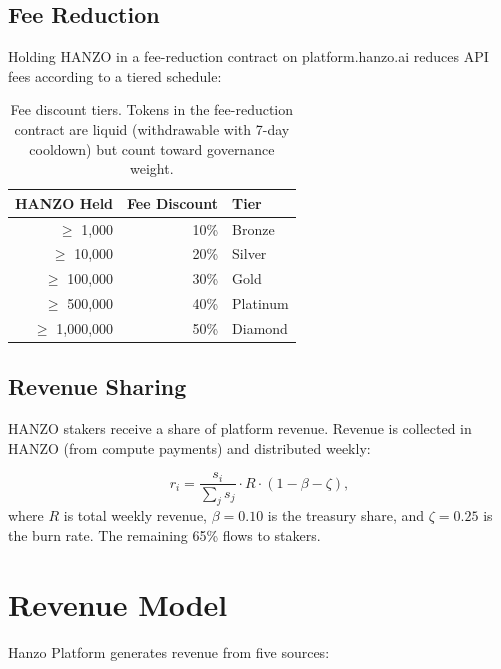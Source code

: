 \documentclass[11pt]{article}
\begin{document}
\subsection{Fee Reduction}
\label{sec:fees}

Holding HANZO in a fee-reduction contract on platform.hanzo.ai reduces API fees
according to a tiered schedule:

\begin{table}[H]
\centering
\small
\begin{tabular}{rrl}
\toprule
\textbf{HANZO Held} & \textbf{Fee Discount} & \textbf{Tier} \\
\midrule
$\geq$ 1,000 & 10\% & Bronze \\
$\geq$ 10,000 & 20\% & Silver \\
$\geq$ 100,000 & 30\% & Gold \\
$\geq$ 500,000 & 40\% & Platinum \\
$\geq$ 1,000,000 & 50\% & Diamond \\
\bottomrule
\end{tabular}
\caption{Fee discount tiers. Tokens in the fee-reduction contract are liquid (withdrawable with 7-day cooldown) but count toward governance weight.}
\label{tab:fees}
\end{table}

\subsection{Revenue Sharing}
\label{sec:revshare}

HANZO stakers receive a share of platform revenue. Revenue is collected in HANZO
(from compute payments) and distributed weekly:

\begin{equation}
r_i = \frac{s_i}{\sum_j s_j} \cdot R \cdot (1 - \beta - \zeta),
\end{equation}
where $R$ is total weekly revenue, $\beta = 0.10$ is the treasury share, and
$\zeta = 0.25$ is the burn rate. The remaining 65\% flows to stakers.

\section{Revenue Model}
\label{sec:revenue}

Hanzo Platform generates revenue from five sources:
\end{document}
